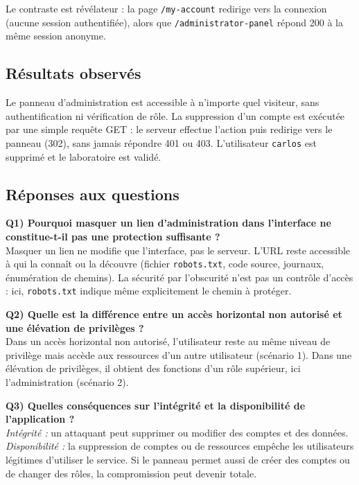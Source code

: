 \documentclass{rapportENSIAS}
\begin{document}
Le contraste est révélateur : la page \texttt{/my-account} redirige vers la connexion (aucune session authentifiée), alors que \texttt{/administrator-panel} répond 200 à la même session anonyme.



\subsection{Résultats observés}

Le panneau d'administration est accessible à n'importe quel visiteur, sans authentification ni vérification de rôle. La suppression d'un compte est exécutée par une simple requête GET : le serveur effectue l'action puis redirige vers le panneau (302), sans jamais répondre 401 ou 403. L'utilisateur \texttt{carlos} est supprimé et le laboratoire est validé.

\subsection{Réponses aux questions}

\textbf{Q1) Pourquoi masquer un lien d'administration dans l'interface ne constitue-t-il pas une protection suffisante ?}\\
Masquer un lien ne modifie que l'interface, pas le serveur. L'URL reste accessible à qui la connaît ou la découvre (fichier \texttt{robots.txt}, code source, journaux, énumération de chemins). La sécurité par l'obscurité n'est pas un contrôle d'accès : ici, \texttt{robots.txt} indique même explicitement le chemin à protéger.

\textbf{Q2) Quelle est la différence entre un accès horizontal non autorisé et une élévation de privilèges ?}\\
Dans un accès horizontal non autorisé, l'utilisateur reste au même niveau de privilège mais accède aux ressources d'un autre utilisateur (scénario 1). Dans une élévation de privilèges, il obtient des fonctions d'un rôle supérieur, ici l'administration (scénario 2).

\textbf{Q3) Quelles conséquences sur l'intégrité et la disponibilité de l'application ?}\\
\textit{Intégrité :} un attaquant peut supprimer ou modifier des comptes et des données. \textit{Disponibilité :} la suppression de comptes ou de ressources empêche les utilisateurs légitimes d'utiliser le service. Si le panneau permet aussi de créer des comptes ou de changer des rôles, la compromission peut devenir totale.
\end{document}
